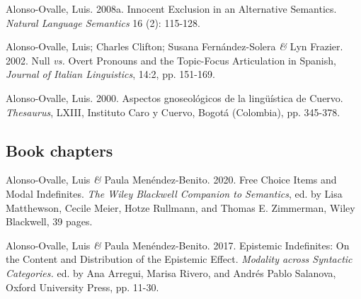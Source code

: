 \documentclass[11pt]{article}
\begin{document}
Alonso-Ovalle, Luis. 2008a. Innocent Exclusion in an
  Alternative Semantics. \textit{Natural Language Semantics} 16 (2):
  115-128. 


Alonso-Ovalle, Luis; Charles Clifton; Susana Fern\'andez-Solera \textit{\&} Lyn Frazier. 2002. Null \textit{vs.} Overt Pronouns and the Topic-Focus Articulation in Spanish, \textit{Journal of Italian Linguistics}, 14:2, pp. 151-169. 

Alonso-Ovalle, Luis. 2000. Aspectos gnoseol\'ogicos de la ling\"u\'istica de Cuervo. \textit{Thesaurus}, LXIII, Instituto Caro y Cuervo, Bogot\'a (Colombia), pp. 345-378. 



\subsection*{Book chapters} 

Alonso-Ovalle, Luis \textit{\&} Paula Men\'endez-Benito. 2020. Free Choice Items and Modal Indefinites. \textit{The Wiley Blackwell Companion to Semantics}, ed. by Lisa Matthewson, Cecile Meier, Hotze Rullmann, and Thomas E. Zimmerman, Wiley Blackwell, 39 pages. %

Alonso-Ovalle, Luis \textit{\&} Paula Men\'endez-Benito. 2017. Epistemic Indefinites: On the Content and Distribution of the Epistemic Effect. \textit{Modality across Syntactic Categories.} ed. by Ana Arregui, Marisa Rivero, and Andr\'es Pablo Salanova, Oxford University Press, pp. 11-30.
\end{document}
